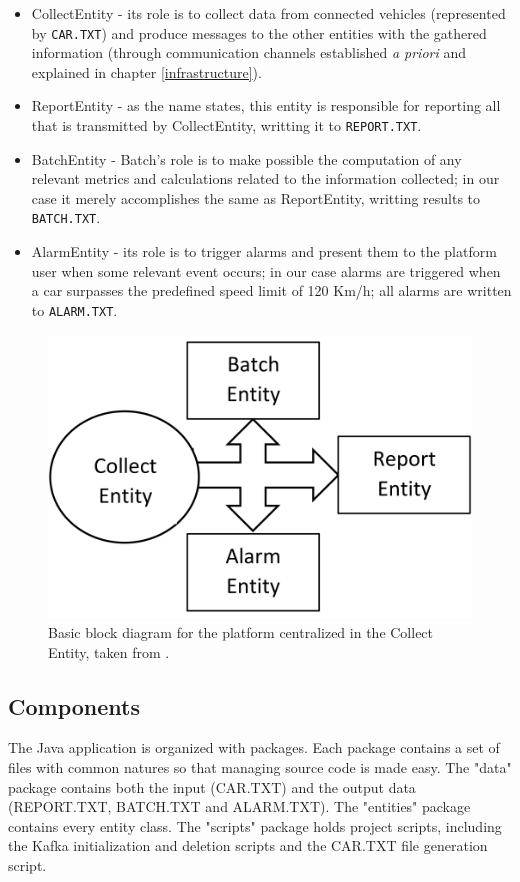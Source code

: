\documentclass[12pt]{article}
\begin{document}
\vspace{-10pt}
\begin{itemize}[noitemsep]
  \item CollectEntity - its role is to collect data from connected vehicles (represented by \texttt{CAR.TXT}) and produce messages to the other entities with the gathered information (through communication channels established \textit{a priori} and explained in chapter \ref{infrastructure}).
  \item ReportEntity - as the name states, this entity is responsible for reporting all that is transmitted by CollectEntity, writting it to \texttt{REPORT.TXT}.
  \item BatchEntity - Batch's role is to make possible the computation of any relevant metrics and calculations related to the information collected; in our case it merely accomplishes the same as ReportEntity, writting results to \texttt{BATCH.TXT}.
  \item AlarmEntity - its role is to trigger alarms and present them to the platform user when some relevant event occurs; in our case alarms are triggered when a car surpasses the predefined speed limit of 120 Km/h; all alarms are written to \texttt{ALARM.TXT}.
\end{itemize}
\vspace{-10pt}

\begin{figure}[H]
  \centering
  \begin{minipage}{\textwidth}
    \centering
    \includegraphics[width=.4\linewidth]{img/BlockDiagram.png}
  \end{minipage}%
  \caption{Basic block diagram for the platform centralized in the Collect Entity, taken from \cite{assign}.}
  \label{BlockDiagram}
\end{figure} 

\subsection{Components} %

The Java application is organized with packages.
Each package contains a set of files with common natures so that managing source code is made easy.
The "data" package contains both the input (CAR.TXT) and the output data (REPORT.TXT, BATCH.TXT and ALARM.TXT).
The "entities" package contains every entity class.
The "scripts" package holds project scripts, including the Kafka initialization and deletion scripts and the CAR.TXT file generation script.
\end{document}
